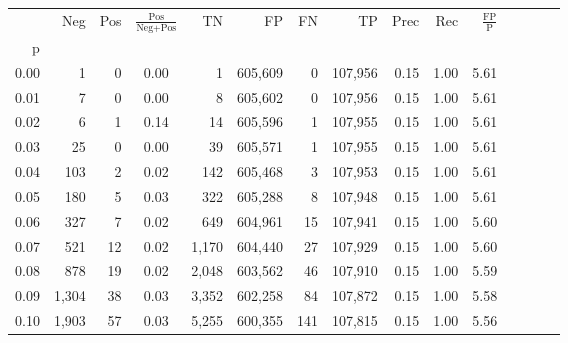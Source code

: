 \begin{tabular}{rrrcrrrrrrrrrrr}
\toprule
{} &     Neg &    Pos & $\frac{\text{Pos}}{\text{Neg}+\text{Pos}}$ &       TN &       FP &       FN &       TP &  Prec &   Rec & $\frac{\text{FP}}{\text{P}}$ \\
p    &         &        &                                            &          &          &          &          &       &       &                              \\
\midrule
0.00 &       1 &      0 &                                       0.00 &        1 &  605,609 &        0 &  107,956 &  0.15 &  1.00 &                         5.61 \\
0.01 &       7 &      0 &                                       0.00 &        8 &  605,602 &        0 &  107,956 &  0.15 &  1.00 &                         5.61 \\
0.02 &       6 &      1 &                                       0.14 &       14 &  605,596 &        1 &  107,955 &  0.15 &  1.00 &                         5.61 \\
0.03 &      25 &      0 &                                       0.00 &       39 &  605,571 &        1 &  107,955 &  0.15 &  1.00 &                         5.61 \\
0.04 &     103 &      2 &                                       0.02 &      142 &  605,468 &        3 &  107,953 &  0.15 &  1.00 &                         5.61 \\
0.05 &     180 &      5 &                                       0.03 &      322 &  605,288 &        8 &  107,948 &  0.15 &  1.00 &                         5.61 \\
0.06 &     327 &      7 &                                       0.02 &      649 &  604,961 &       15 &  107,941 &  0.15 &  1.00 &                         5.60 \\
0.07 &     521 &     12 &                                       0.02 &    1,170 &  604,440 &       27 &  107,929 &  0.15 &  1.00 &                         5.60 \\
0.08 &     878 &     19 &                                       0.02 &    2,048 &  603,562 &       46 &  107,910 &  0.15 &  1.00 &                         5.59 \\
0.09 &   1,304 &     38 &                                       0.03 &    3,352 &  602,258 &       84 &  107,872 &  0.15 &  1.00 &                         5.58 \\
0.10 &   1,903 &     57 &                                       0.03 &    5,255 &  600,355 &      141 &  107,815 &  0.15 &  1.00 &                         5.56 \\

\end{tabular}
